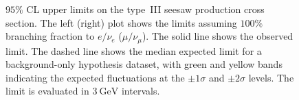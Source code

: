 \begin{figure}[htbp]
  \centering
  \caption{$95 \%$ CL upper limits on the type~III seesaw production cross section. The left (right) plot shows the limits assuming $100\%$ branching fraction to $e/\nu_e$ ($\mu/\nu_{\mu}$). The solid line shows the observed limit. The dashed line shows the median expected limit for a background-only hypothesis dataset, with green and yellow bands indicating the expected fluctuations at the $\pm1\sigma$ and $\pm 2 \sigma$ levels. The limit is evaluated in $\SI{3}{\giga\electronvolt}$ intervals.}
  \label{fig:T3SSLimit}
\end{figure}

